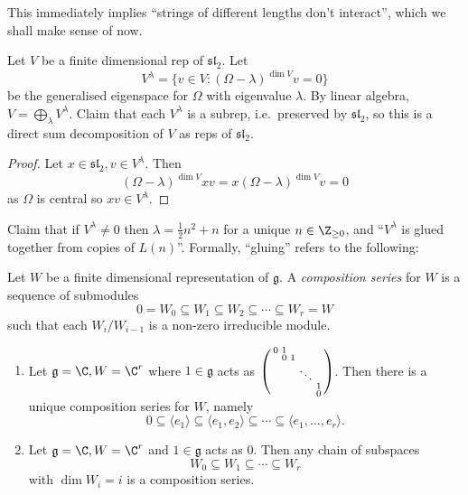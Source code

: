 \documentclass[a4paper]{article}
\newcommand*{\Lie}[1]{\mathfrak{#1}} %
\begin{document}
This immediately implies ``strings of different lengths don't interact'', which we shall make sense of now.

Let \(V\) be a finite dimensional rep of \(\Lie{sl}_2\). Let
\[
  V^\lambda = \{v \in V: (\Omega - \lambda)^{\dim V} v = 0\}
\]
be the generalised eigenspace for \(\Omega\) with eigenvalue \(\lambda\). By linear algebra, \(V = \bigoplus_\lambda V^\lambda\). Claim that each \(V^\lambda\) is a subrep, i.e.\ preserved by \(\Lie{sl}_2\), so this is a direct sum decomposition of \(V\) as reps of \(\Lie{sl}_2\).

\begin{proof}
  Let \(x \in \Lie{sl}_2, v \in V^\lambda\). Then
  \[
    (\Omega - \lambda)^{\dim V} xv = x(\Omega - \lambda)^{\dim V} v = 0
  \]
  as \(\Omega\) is central so \(xv \in V^\lambda\).
\end{proof}

Claim that if \(V^\lambda \neq 0\) then \(\lambda = \frac{1}{2} n^2 + n\) for a unique \(n \in \Z_{\geq 0}\), and ``\(V^\lambda\) is glued together from copies of \(L(n)\)''. Formally, ``gluing'' refers to the following:

\begin{definition}
  Let \(W\) be a finite dimensional representation of \(\Lie g\). A \emph{composition series} for \(W\) is a sequence of submodules
  \[
    0 = W_0 \subseteq W_1 \subseteq W_2 \subseteq \cdots \subseteq W_r = W
  \]
  such that each \(W_i/W_{i - 1}\) is a non-zero irreducible module.
\end{definition}

\begin{eg}\leavevmode
  \begin{enumerate}
  \item Let \(\Lie g = \C, W = \C^r\) where \(1 \in \Lie g\) acts as \(
    \begin{psmallmatrix}
    0 & 1 \\
    & 0 & 1 \\
    & & & \ddots \\
    & & & & 1 \\
    & & & & 0
  \end{psmallmatrix}
  \). Then there is a unique composition series for \(W\), namely
  \[
    0 \subseteq \langle e_1 \rangle \subseteq \langle e_1, e_2 \rangle \subseteq \cdots \subseteq \langle e_1, \dots, e_r \rangle.
  \]
\item Let \(\Lie g = \C, W = \C^r\) and \(1 \in \Lie g\) acts as \(0\). Then any chain of subspaces
  \[
    W_0 \subseteq W_1 \subseteq \cdots \subseteq W_r
  \]
  with \(\dim W_i = i\) is a composition series.
  \end{enumerate}
\end{eg}
\end{document}
